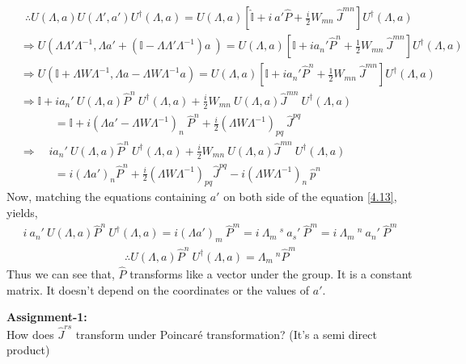 \documentclass[14pt]{article} %
\begin{document}
\begin{align*}
&~~\therefore U(\Lambda, a) U(\Lambda', a') U^\dagger(\Lambda, a) = U(\Lambda, a) \left[ \hat{\mathbb{I}} + i~a'\hat{P} + \frac{i}{2} W_{mn} ~\hat{J}^{mn} \right] U^\dagger(\Lambda, a) \\
&\Rightarrow U\left(\Lambda \Lambda'\Lambda^{-1}, \Lambda a' + (\mathbb{I} - \Lambda \Lambda'\Lambda^{-1})a~ \right) = U(\Lambda, a)\left[\mathbb{I} + i a_n' \hat{P}^n + \frac{1}{2} W_{mn}~ \hat{J}^{mn}\right] U^\dagger(\Lambda, a) \\
&\Rightarrow U(\mathbb{I} + \Lambda W \Lambda^{-1}, \Lambda a - \Lambda W \Lambda^{-1}a) = U(\Lambda, a)\left[\mathbb{I} + i a_n' \hat{P}^n + \frac{1}{2} W_{mn}~ \hat{J}^{mn}\right] U^\dagger(\Lambda, a) \\
&\Rightarrow \mathbb{I} + i a_n' ~U(\Lambda, a) \hat{P}^n~ U^\dagger(\Lambda, a) + \frac{i}{2} W_{mn}~ U(\Lambda, a) \hat{J}^{mn}~U^\dagger(\Lambda, a) \\
& \quad \quad \quad= \mathbb{I} + i (\Lambda a'-\Lambda W \Lambda^{-1})_n ~\hat{P}^n + \frac{i}{2} (\Lambda W \Lambda^{-1})_{pq}~ \hat{J}^{pq} \tag{4.12}  \label{4.12}\\
&\Rightarrow\quad i a_n'~ U(\Lambda, a) \hat{P}^n~ U^\dagger(\Lambda, a) + \frac{i}{2} W_{mn} ~U(\Lambda, a) \hat{J}^{mn}~ U^\dagger(\Lambda, a) \\
& \quad \quad \quad= i {(\Lambda a')}_n \hat{P}^n + \frac{i}{2} {(\Lambda W \Lambda^{-1})}_{pq} \hat{J}^{pq} -i(\Lambda W \Lambda^{-1})_n~\hat{p}^n \tag{4.13}  \label{4.13}
\end{align*}
Now, matching the equations containing $a'$ on both side of the equation \eqref{4.13}, yields,
\begin{align*}
i ~a_n' ~U(\Lambda,a) \hat{P}^n ~U^\dagger(\Lambda, a) = i{(\Lambda a')}_m~\hat{P}^m = i~ \Lambda_m~^s~a_s'~\hat{P}^m = i~\Lambda_m~^n~a_n'~\hat{P}^m 
\end{align*}
\begin{align*}
\boxed{\therefore U(\Lambda, a) \hat{P}^n~ U^\dagger(\Lambda, a) = \Lambda_m~^n\hat{P}^m}
\end{align*}
Thus we can see that, $\hat{P}$ transforms like a vector under the group. It is a constant matrix. It doesn't depend on the coordinates or the values of $a'$.
 \vspace{0.5cm}
\begin{framed}
\noindent \textbf{Assignment-1:}\\
\noindent How does $\hat{J}^{rs}$ transform under Poincaré transformation? (It's a semi direct product)
\end{framed}
\end{document}
